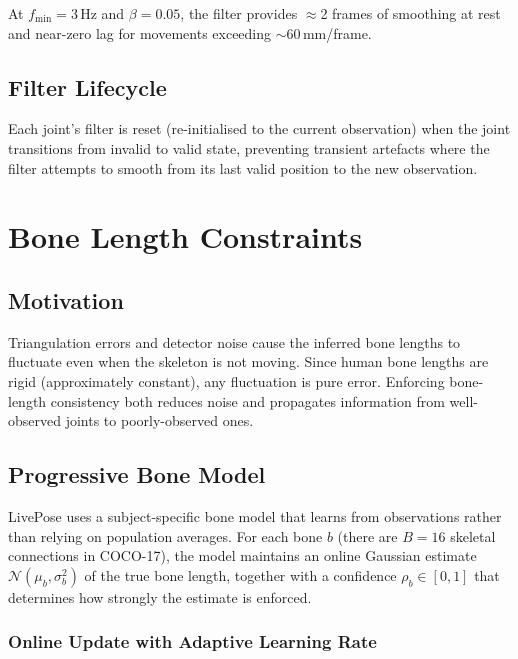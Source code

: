 \documentclass[11pt,a4paper]{article}
\begin{document}
At $f_{\min} = 3\,\text{Hz}$ and $\beta = 0.05$, the filter provides $\approx$2
frames of smoothing at rest and near-zero lag for movements exceeding
$\sim$60\,mm/frame.

\subsection{Filter Lifecycle}

Each joint's filter is reset (re-initialised to the current observation) when the
joint transitions from invalid to valid state, preventing transient artefacts where the
filter attempts to smooth from its last valid position to the new observation.

\section{Bone Length Constraints}

\subsection{Motivation}

Triangulation errors and detector noise cause the inferred bone lengths to fluctuate
even when the skeleton is not moving. Since human bone lengths are rigid
(approximately constant), any fluctuation is pure error. Enforcing bone-length
consistency both reduces noise and propagates information from well-observed joints
to poorly-observed ones.

\subsection{Progressive Bone Model}

LivePose uses a subject-specific bone model that learns from observations rather than
relying on population averages. For each bone $b$ (there are $B = 16$ skeletal
connections in COCO-17), the model maintains an online Gaussian estimate
$\mathcal{N}(\mu_b, \sigma_b^2)$ of the true bone length, together with a confidence
$\rho_b \in [0,1]$ that determines how strongly the estimate is enforced.

\subsubsection{Online Update with Adaptive Learning Rate}
\end{document}
